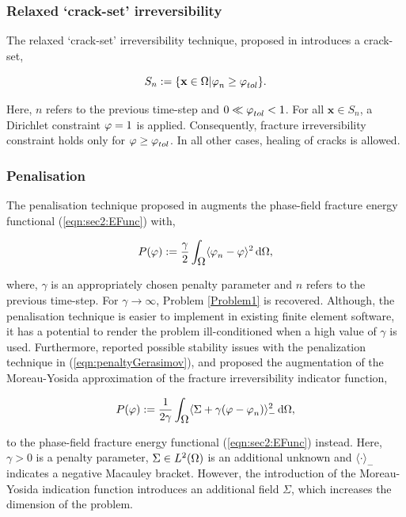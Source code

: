 \documentclass[11pt]{article}
\begin{document}
\subsubsection{Relaxed `crack-set' irreversibility}

The relaxed `crack-set' irreversibility technique, proposed in \cite{Bourdin2000,Bourdin2007} introduces a crack-set,

\begin{equation}
S_{n} := \{ \mathbf{x} \in \hbox{$\Omega$} | \hbox{$\varphi$}_{n} \geq \hbox{$\varphi$}_{tol} \}.
\end{equation}

Here, $n$ refers to the previous time-step and $0 \ll \hbox{$\varphi$}_{tol} < 1$. For all $\mathbf{x} \in S_{n}$, a Dirichlet constraint $\hbox{$\varphi$} = 1$ is applied. Consequently, fracture irreversibility constraint holds only for $\hbox{$\varphi$} \geq \hbox{$\varphi$}_{tol}$. In all other cases, healing of cracks is allowed.

\subsubsection{Penalisation}

The penalisation technique proposed in \cite{GERASIMOV2019990} augments the phase-field fracture energy functional (\ref{eqn:sec2:EFunc}) with,

\begin{equation}\label{eqn:penaltyGerasimov}
P(\hbox{$\varphi$}) := \dfrac{\gamma}{2} \int_{\hbox{$\Omega$}} \langle \hbox{$\varphi$}_n - \hbox{$\varphi$} \rangle^2 \, \text{d}\hbox{$\Omega$},
\end{equation}

where, $\gamma$ is an appropriately chosen penalty parameter and $n$ refers to the previous time-step. For $\gamma \longrightarrow \infty$, Problem \ref{Problem1} is recovered. Although, the penalisation technique is easier to implement in existing finite element software, it has a potential to render the problem ill-conditioned when a high value of $\gamma$ is used. Furthermore, \cite{Wick2017a} reported possible stability issues with the penalization technique in (\ref{eqn:penaltyGerasimov}), and proposed the augmentation of the Moreau-Yosida approximation of the fracture irreversibility indicator function,

\begin{equation}\label{eqn:penaltyWick}
P(\hbox{$\varphi$}) := \dfrac{1}{2 \gamma} \int_{\hbox{$\Omega$}} \langle \Sigma + \gamma (\hbox{$\varphi$} - \hbox{$\varphi$}_{n}) \rangle^{2}_{-} \, \text{d}\hbox{$\Omega$},
\end{equation}

to the phase-field fracture energy functional (\ref{eqn:sec2:EFunc}) instead. Here, $\gamma > 0$ is a penalty parameter, $\Sigma \in L^2(\hbox{$\Omega$})$ is an additional unknown and $\langle \cdot \rangle_{-}$ indicates a negative Macauley bracket. However, the introduction of the Moreau-Yosida indication function introduces an additional field $\Sigma$, which increases the dimension of the problem.
\end{document}
